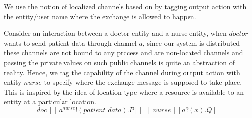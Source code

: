 We use the notion of localized channels based on \cite{hennessy2002resource} \cite{braghin2004distributed} by tagging output action with the entity/user name where the exchange is allowed to happen. 
\begin{example}
 Consider an interaction between a doctor entity and a nurse entity, when $ \textit{doctor}$ wants to send patient data through channel $ a $, since our system is distributed these channels are not bound to any process and are non-located channels and passing the private values on such public channels is quite an abstraction of reality. Hence, we tag the capability of the channel during output action with entity $ \textit{nurse}$ to specify where the exchange message is supposed to take place. This is inspired by the idea of location type where a resource is available to an entity at a particular location. 
   \[ doc \  [\![ \  a^{nurse}! ( patient\_{data}) . P  ]\!] \ \ || \ \  nurse \ [\![  a?(x) . Q  ]\!]\]  
\end{example}
 

